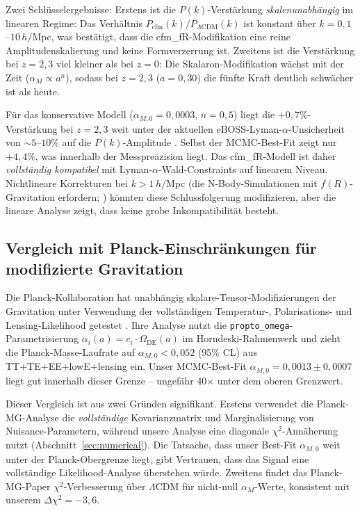 \documentclass[11pt,a4paper]{article}
\begin{document}
Zwei Schl\"usselergebnisse: Erstens ist die $P(k)$-Verst\"arkung \textit{skalenunabh\"angig} im linearen Regime: Das Verh\"altnis $P_{\mathrm{cfm}}(k)/P_{\Lambda\mathrm{CDM}}(k)$ ist konstant \"uber $k = 0{,}1$--$10\,h/$Mpc, was best\"atigt, dass die cfm\_fR-Modifikation eine reine Amplitudenskalierung und keine Formverzerrung ist. Zweitens ist die Verst\"arkung bei $z = 2{,}3$ viel kleiner als bei $z = 0$: Die Skalaron-Modifikation w\"achst mit der Zeit ($\alpha_M \propto a^n$), sodass bei $z = 2{,}3$ ($a = 0{,}30$) die f\"unfte Kraft deutlich schw\"acher ist als heute.

F\"ur das konservative Modell ($\alpha_{M,0} = 0{,}0003$, $n = 0{,}5$) liegt die $+0{,}7\%$-Verst\"arkung bei $z = 2{,}3$ weit unter der aktuellen eBOSS-Lyman-$\alpha$-Unsicherheit von $\sim 5$--$10\%$ auf die $P(k)$-Amplitude \cite{Chabanier2019}. Selbst der MCMC-Best-Fit zeigt nur $+4{,}4\%$, was innerhalb der Messpre\"azision liegt. Das cfm\_fR-Modell ist daher \textit{vollst\"andig kompatibel} mit Lyman-$\alpha$-Wald-Constraints auf linearem Niveau. Nichtlineare Korrekturen bei $k > 1\,h/$Mpc (die N-Body-Simulationen mit $f(R)$-Gravitation erfordern; \cite{Li2012}) k\"onnten diese Schlussfolgerung modifizieren, aber die lineare Analyse zeigt, dass keine grobe Inkompatibilit\"at besteht.

\subsection{Vergleich mit Planck-Einschr\"ankungen f\"ur modifizierte Gravitation}
\label{subsec:planck_mg}

Die Planck-Kollaboration hat unabh\"angig skalare-Tensor-Modifizierungen der Gravitation unter Verwendung der vollst\"andigen Temperatur-, Polarisations- und Lensing-Likelihood getestet \cite{PlanckMG2016}. Ihre Analyse nutzt die \texttt{propto\_omega}-Parametrisierung $\alpha_i(a) = c_i \cdot \Omega_{\mathrm{DE}}(a)$ im Horndeski-Rahmenwerk und zieht die Planck-Masse-Laufrate auf $\alpha_{M,0} < 0{,}052$ (95\% CL) aus TT+TE+EE+lowE+lensing ein. Unser MCMC-Best-Fit $\alpha_{M,0} = 0{,}0013 \pm 0{,}0007$ liegt gut innerhalb dieser Grenze -- ungef\"ahr 40$\times$ unter dem oberen Grenzwert.

Dieser Vergleich ist aus zwei Gr\"unden signifikant. Erstens verwendet die Planck-MG-Analyse die \textit{vollst\"andige} Kovarianzmatrix und Marginalisierung von Nuisance-Parametern, w\"ahrend unsere Analyse eine diagonale $\chi^2$-Ann\"aherung nutzt (Abschnitt~\ref{sec:numerical}). Die Tatsache, dass unser Best-Fit $\alpha_{M,0}$ weit unter der Planck-Obergrenze liegt, gibt Vertrauen, dass das Signal eine vollst\"andige Likelihood-Analyse \"uberstehen w\"urde. Zweitens findet das Planck-MG-Paper $\chi^2$-Verbesserung \"uber $\Lambda$CDM f\"ur nicht-null $\alpha_M$-Werte, konsistent mit unserem $\Delta\chi^2 = -3{,}6$.
\end{document}

